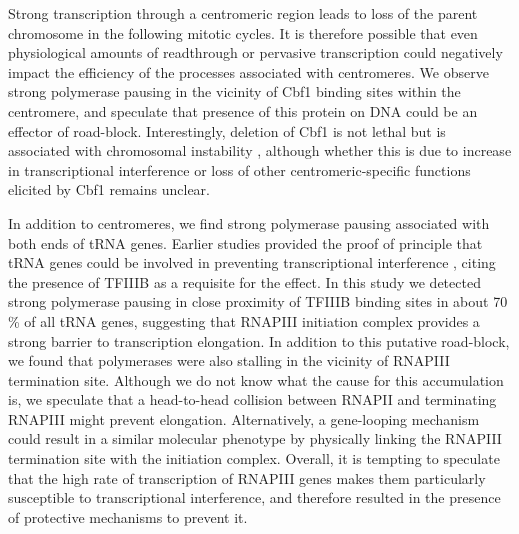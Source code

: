 Strong transcription through a centromeric region leads to loss of the parent chromosome \cite{apostol:1988:copy} in the following mitotic cycles. 
It is therefore possible that even physiological amounts of readthrough or pervasive transcription could negatively impact the efficiency of the processes associated with centromeres. 
We observe strong polymerase pausing in the vicinity of Cbf1 binding sites within the centromere, and speculate that presence of this protein on DNA could be an effector of road-block. 
Interestingly, deletion of Cbf1 is not lethal but is associated with chromosomal instability \cite{cai:1990:yeast}, although whether this is due to increase in transcriptional interference or loss of other centromeric-specific functions elicited by Cbf1 remains unclear.

In addition to centromeres, we find strong polymerase pausing associated with both ends of tRNA genes. 
Earlier studies provided the proof of principle that tRNA genes could be involved in preventing transcriptional interference \cite{korde:2014:intergenic}, citing the presence of TFIIIB as a requisite for the effect. 
In this study we detected strong polymerase pausing in close proximity of TFIIIB binding sites in about 70 \% of all tRNA genes, suggesting that RNAPIII initiation complex provides a strong barrier to transcription elongation. 
In addition to this putative road-block, we found that polymerases were also stalling in the vicinity of RNAPIII termination site. 
Although we do not know what the cause for this accumulation is, we speculate that a head-to-head collision between RNAPII and terminating RNAPIII might prevent elongation. 
Alternatively, a gene-looping mechanism could result in a similar molecular phenotype by physically linking the RNAPIII termination site with the initiation complex. Overall, it is tempting to speculate that the high rate of transcription of RNAPIII genes makes them particularly susceptible to transcriptional interference, and therefore resulted in the presence of protective mechanisms to prevent it.
